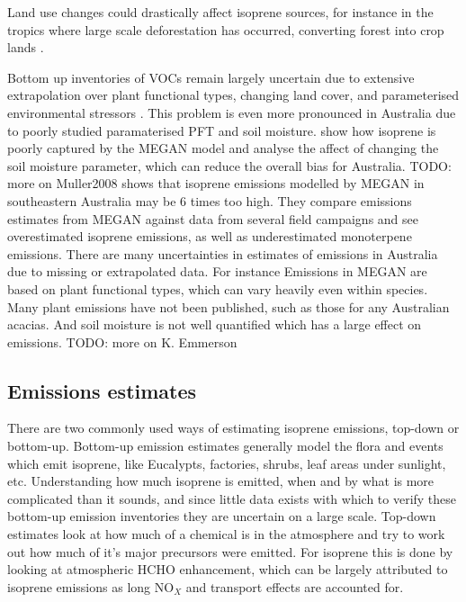     Land use changes could drastically affect isoprene sources, for instance in the tropics where large scale deforestation has occurred, converting forest into crop lands \citep{Kanakidou2005}.
    
    Bottom up inventories of VOCs remain largely uncertain due to extensive extrapolation over plant functional types, changing land cover, and parameterised environmental stressors \citep{Guenther2000,Kanakidou2005}.
    This problem is even more pronounced in Australia due to poorly studied paramaterised PFT and soil moisture.
    \cite{Muller2008} show how isoprene is poorly captured by the MEGAN model and analyse the affect of changing the soil moisture parameter, which can reduce the overall bias for Australia.
    TODO: more on Muller2008
    \cite{Emmerson2016} shows that isoprene emissions modelled by MEGAN in southeastern Australia may be 6 times too high. 
    They compare emissions estimates from MEGAN against data from several field campaigns and see overestimated isoprene emissions, as well as underestimated monoterpene emissions.
    There are many uncertainties in estimates of emissions in Australia due to missing or extrapolated data.
    For instance Emissions in MEGAN are based on plant functional types, which can vary heavily even within species.
    Many plant emissions have not been published, such as those for any Australian acacias.
    And soil moisture is not well quantified which has a large effect on emissions.
    TODO: more on K. Emmerson
    
    
  \subsection{Emissions estimates}

    There are two commonly used ways of estimating isoprene emissions, top-down or bottom-up.
    Bottom-up emission estimates generally model the flora and events which emit isoprene, like Eucalypts, factories, shrubs, leaf areas under sunlight, etc.
    Understanding how much isoprene is emitted, when and by what is more complicated than it sounds, and since little data exists with which to verify these bottom-up emission inventories they are uncertain on a large scale.
    Top-down estimates look at how much of a chemical is in the atmosphere and try to work out how much of it's major precursors were emitted.
    For isoprene this is done by looking at atmospheric HCHO enhancement, which can be largely attributed to isoprene emissions as long NO$_X$ and transport effects are accounted for.
    
